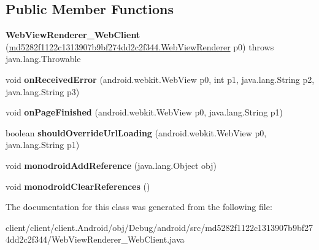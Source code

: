\subsection*{Public Member Functions}
\begin{DoxyCompactItemize}
\item 
\hypertarget{classmd5282f1122c1313907b9bf274dd2c2f344_1_1WebViewRenderer__WebClient_a60fd7b6a54c067662fabb23b0c8d56e2}{}{\bfseries Web\+View\+Renderer\+\_\+\+Web\+Client} (\hyperlink{classmd5282f1122c1313907b9bf274dd2c2f344_1_1WebViewRenderer}{md5282f1122c1313907b9bf274dd2c2f344.\+Web\+View\+Renderer} p0)  throws java.\+lang.\+Throwable 	\label{classmd5282f1122c1313907b9bf274dd2c2f344_1_1WebViewRenderer__WebClient_a60fd7b6a54c067662fabb23b0c8d56e2}

\item 
\hypertarget{classmd5282f1122c1313907b9bf274dd2c2f344_1_1WebViewRenderer__WebClient_a64ea9b380920291399ab9a84e57d6558}{}void {\bfseries on\+Received\+Error} (android.\+webkit.\+Web\+View p0, int p1, java.\+lang.\+String p2, java.\+lang.\+String p3)\label{classmd5282f1122c1313907b9bf274dd2c2f344_1_1WebViewRenderer__WebClient_a64ea9b380920291399ab9a84e57d6558}

\item 
\hypertarget{classmd5282f1122c1313907b9bf274dd2c2f344_1_1WebViewRenderer__WebClient_ad2d07e003af3d412a336189900b304a2}{}void {\bfseries on\+Page\+Finished} (android.\+webkit.\+Web\+View p0, java.\+lang.\+String p1)\label{classmd5282f1122c1313907b9bf274dd2c2f344_1_1WebViewRenderer__WebClient_ad2d07e003af3d412a336189900b304a2}

\item 
\hypertarget{classmd5282f1122c1313907b9bf274dd2c2f344_1_1WebViewRenderer__WebClient_a686ca02335e3f0dcde8d84c09927d16e}{}boolean {\bfseries should\+Override\+Url\+Loading} (android.\+webkit.\+Web\+View p0, java.\+lang.\+String p1)\label{classmd5282f1122c1313907b9bf274dd2c2f344_1_1WebViewRenderer__WebClient_a686ca02335e3f0dcde8d84c09927d16e}

\item 
\hypertarget{classmd5282f1122c1313907b9bf274dd2c2f344_1_1WebViewRenderer__WebClient_a2d45a02086244c8913fabd1a02a195df}{}void {\bfseries monodroid\+Add\+Reference} (java.\+lang.\+Object obj)\label{classmd5282f1122c1313907b9bf274dd2c2f344_1_1WebViewRenderer__WebClient_a2d45a02086244c8913fabd1a02a195df}

\item 
\hypertarget{classmd5282f1122c1313907b9bf274dd2c2f344_1_1WebViewRenderer__WebClient_a962ef1495b9b6fefc0a3f97d94bb7959}{}void {\bfseries monodroid\+Clear\+References} ()\label{classmd5282f1122c1313907b9bf274dd2c2f344_1_1WebViewRenderer__WebClient_a962ef1495b9b6fefc0a3f97d94bb7959}

\end{DoxyCompactItemize}


The documentation for this class was generated from the following file\+:\begin{DoxyCompactItemize}
\item 
client/client/client.\+Android/obj/\+Debug/android/src/md5282f1122c1313907b9bf274dd2c2f344/Web\+View\+Renderer\+\_\+\+Web\+Client.\+java\end{DoxyCompactItemize}
